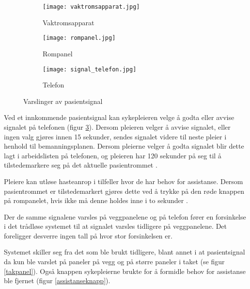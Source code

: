 \begin{figure}[H]
        \centering
         \begin{subfigure}[b]{0.3\textwidth}
        		\centering
                \texttt{[image: vaktromsapparat.jpg]}
                \caption{Vaktromsapparat}
                \label{rompanel}
        \end{subfigure}
        \begin{subfigure}[b]{0.3\textwidth}
        		\centering
                \texttt{[image: rompanel.jpg]}
                \caption{Rompanel}
                \label{rompanel}
        \end{subfigure}
          \begin{subfigure}[b]{0.3\textwidth}
        		\centering
                \texttt{[image: signal\_telefon.jpg]}
                \caption{Telefon}
                \label{signal_telefon}
        \end{subfigure}      
        \caption{Varslinger av pasientsignal}
        \label{varslinger}
\end{figure}

\noindent
Ved et innkommende pasientsignal kan sykepleieren velge å godta eller avvise signalet på telefonen (figur \ref{signal_telefon}). Dersom pleieren velger å avvise signalet, eller ingen valg gjøres innen 15 sekunder, sendes signalet videre til neste pleier i henhold til bemanningsplanen. Dersom pleierne velger å godta signalet blir dette lagt i arbeidslisten på telefonen, og pleieren har 120 sekunder på seg til å tilstedemarkere seg på det aktuelle pasientrommet \citep{BrukermanualforPasientsignalogPasientsignalapplikasjon}. 

\noindent
Pleiere kan utløse hasteanrop i tilfeller hvor de har behov for assistanse. Dersom pasientrommet er tilstedemarkert gjøres dette ved å trykke på den røde knappen på rompanelet, hvis ikke må denne holdes inne i to sekunder \citep{BrukerveiledningforPasientsignal}.

\noindent
Der de samme signalene varsles på veggpanelene og på telefon fører en forsinkelse i det trådløse systemet til at signalet varsles tidligere på veggpanelene. Det foreligger desverre ingen tall på hvor stor forsinkelsen er. 

\noindent
Systemet skiller seg fra det som ble brukt tidligere, blant annet i at pasientsignal da kun ble varslet på paneler på vegg og på større paneler i taket (se figur \ref{takpanel}). Også knappen sykepleierne brukte for å formidle behov for assistanse ble fjernet (figur \ref{assistanseknapp}). 


